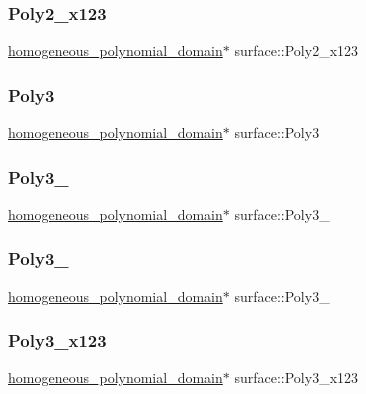 \subsubsection{\texorpdfstring{Poly2\+\_\+x123}{Poly2\_x123}}
{\footnotesize\ttfamily \mbox{\hyperlink{classhomogeneous__polynomial__domain}{homogeneous\+\_\+polynomial\+\_\+domain}}$\ast$ surface\+::\+Poly2\+\_\+x123}

\mbox{\label{classsurface_a066b04346d79de2bdc91b8ad6ff40774}} 
\subsubsection{\texorpdfstring{Poly3}{Poly3}}
{\footnotesize\ttfamily \mbox{\hyperlink{classhomogeneous__polynomial__domain}{homogeneous\+\_\+polynomial\+\_\+domain}}$\ast$ surface\+::\+Poly3}

\mbox{\label{classsurface_a5f83d7e46884410b616f6d2505d9db37}} 
\subsubsection{\texorpdfstring{Poly3\+\_}{Poly3\_24}}
{\footnotesize\ttfamily \mbox{\hyperlink{classhomogeneous__polynomial__domain}{homogeneous\+\_\+polynomial\+\_\+domain}}$\ast$ surface\+::\+Poly3\+\_}

\mbox{\label{classsurface_abbe56a49f6f4c9d8333b94774da661a3}} 
\subsubsection{\texorpdfstring{Poly3\+\_}{Poly3\_4}}
{\footnotesize\ttfamily \mbox{\hyperlink{classhomogeneous__polynomial__domain}{homogeneous\+\_\+polynomial\+\_\+domain}}$\ast$ surface\+::\+Poly3\+\_}

\mbox{\label{classsurface_a257ae7f8b530b0585ffede9506e43994}} 
\subsubsection{\texorpdfstring{Poly3\+\_\+x123}{Poly3\_x123}}
{\footnotesize\ttfamily \mbox{\hyperlink{classhomogeneous__polynomial__domain}{homogeneous\+\_\+polynomial\+\_\+domain}}$\ast$ surface\+::\+Poly3\+\_\+x123}

